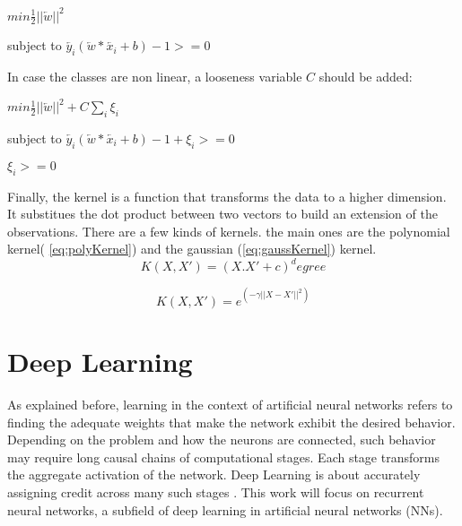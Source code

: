 \centerline{$min \frac{1}{2}||\overleftarrow{w}||^2$\\}
\centerline{subject to $\overleftarrow{y_i} (\overleftarrow{w}*\overleftarrow{x_i}+b)-1>=0$ \\}

In case the classes are non linear, a looseness variable $C$ should be added: \\
\centerline{$min \frac{1}{2}||\overleftarrow{w}||^2+C\sum_{i}\xi_i$\\}
\centerline{subject to $\overleftarrow{y_i} (\overleftarrow{w}*\overleftarrow{x_i}+b)-1+\xi_i>=0$\\}
\centerline{$\xi_i>=0$}

Finally, the kernel is a function that transforms the data to a higher dimension. It substitues the dot product between two vectors to build an extension of the observations. There are a few kinds of kernels. the main ones are the polynomial kernel( \ref{eq:polyKernel}) and the gaussian (\ref{eq:gaussKernel}) kernel.
\begin{equation} \label{eq:polyKernel}
K(X,X')=(X.X'+c)^degree
\end{equation}

\begin{equation} \label{eq:gaussKernel}
K(X,X')=e^(-\gamma ||X-X'||^2)
\end{equation}

\section{Deep Learning}
As explained before, learning in the context of artificial neural networks refers to finding the adequate weights that make the network exhibit the desired behavior. Depending on the problem and how the neurons are connected, such behavior may require long causal chains of computational stages. Each stage transforms the aggregate activation of the network. Deep Learning is about accurately assigning credit across many such stages \cite{schmidhuber2015deep}. This work will focus on recurrent neural networks, a subfield of deep learning in artificial neural networks (NNs).

